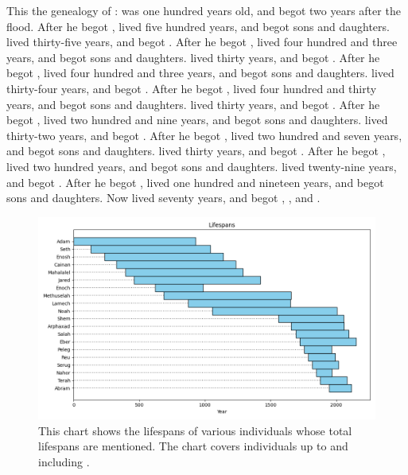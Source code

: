 
\bverse This \is the genealogy of :  was one hundred years old, and begot  two years after the flood.
\bverse After he begot ,  lived five hundred years, and begot sons and daughters.
\bverse {} lived thirty-five years, and begot .
\bverse After he begot ,  lived four hundred and three years, and begot sons and daughters.
\bverse {} lived thirty years, and begot .
\bverse After he begot ,  lived four hundred and three years, and begot sons and daughters.
\bverse {} lived thirty-four years, and begot .
\bverse After he begot ,  lived four hundred and thirty years, and begot sons and daughters.
\bverse {} lived thirty years, and begot . 
\bverse After he begot ,  lived two hundred and nine years, and begot sons and daughters.
\bverse {} lived thirty-two years, and begot .
\bverse After he begot ,  lived two hundred and seven years, and begot sons and daughters.
\bverse {} lived thirty years, and begot .
\bverse After he begot ,  lived two hundred years, and begot sons and daughters.
\bverse {} lived twenty-nine years, and begot .
\bverse After he begot ,  lived one hundred and nineteen years, and begot sons and daughters.
\bverse Now  lived seventy years, and begot , , and .



\begin{figure}[h] %
	\centering
	\includegraphics[width=0.95\linewidth]{images/lifespans/pre_abram_lifespans.png}
	\caption{This chart shows the lifespans of various individuals whose total lifespans are mentioned. The chart covers individuals up to and including .}
	\label{fig:pre_adam_lifespans}
\end{figure}



